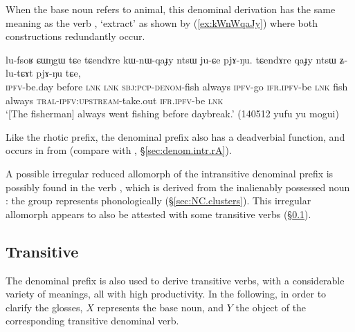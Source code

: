 When the base noun refers to animal, this denominal derivation has the same meaning as the verb , `extract' as shown by (\ref{ex:kWnWqaJy}) where both constructions redundantly occur.
 
\begin{exe}
\ex \label{ex:kWnWqaJy}
\gll lu-fsoʁ ɕɯŋgɯ tɕe tɕendɤre kɯ-nɯ-qaɟy ntsɯ ju-ɕe pjɤ-ŋu. tɕendɤre qaɟy ntsɯ ʑ-lu-tɕɤt pjɤ-ŋu tɕe, \\
\textsc{ipfv}-be.day before \textsc{lnk} \textsc{lnk} \textsc{sbj}:\textsc{pcp}-\textsc{denom}-fish always \textsc{ipfv}-go \textsc{ifr}.\textsc{ipfv}-be \textsc{lnk} fish always \textsc{tral}-\textsc{ipfv}:\textsc{upstream}-take.out \textsc{ifr}.\textsc{ipfv}-be  \textsc{lnk} \\
\glt `[The fisherman] always went fishing before daybreak.' (140512 yufu yu mogui)
\end{exe}

Like the rhotic prefix, the  denominal prefix also has a deadverbial function, and occurs in  from  (compare with  , §\ref{sec:denom.intr.rA}).
  
A possible irregular reduced allomorph  of the intransitive denominal  prefix is possibly found in the verb , which is derived from the inalienably possessed noun : the group  represents  phonologically (§\ref{sec:NC.clusters}). This irregular allomorph appears to also be attested with some transitive verbs (§\ref{sec:denom.tr.nW}).

\subsection{Transitive}   \label{sec:denom.tr.nW}
The  denominal prefix is also used to derive transitive verbs, with a considerable variety of meanings, all with high productivity. In the following, in order to clarify the glosses, $X$ represents the base noun, and $Y$ the object of the corresponding transitive  denominal verb.

